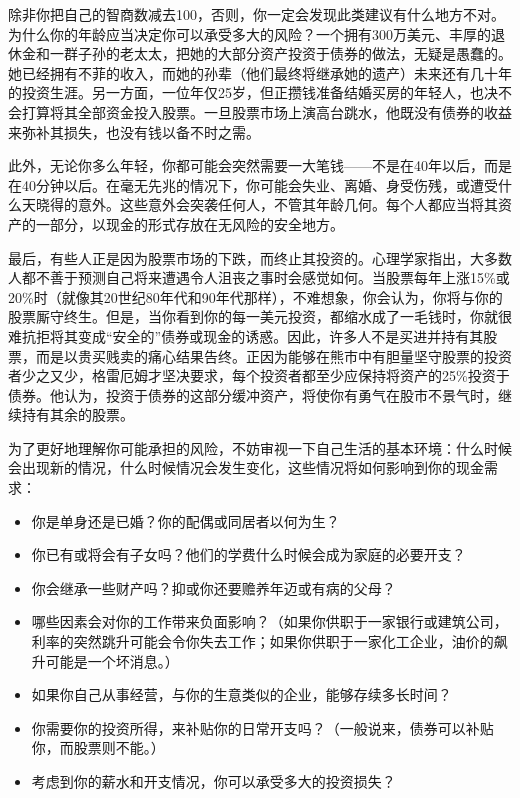 \documentclass[12pt,oneside]{book}
\begin{document}
除非你把自己的智商数减去100，否则，你一定会发现此类建议有什么地方不对。为什么你的年龄应当决定你可以承受多大的风险？一个拥有300万美元、丰厚的退休金和一群子孙的老太太，把她的大部分资产投资于债券的做法，无疑是愚蠢的。她已经拥有不菲的收入，而她的孙辈（他们最终将继承她的遗产）未来还有几十年的投资生涯。另一方面，一位年仅25岁，但正攒钱准备结婚买房的年轻人，也决不会打算将其全部资金投入股票。一旦股票市场上演高台跳水，他既没有债券的收益来弥补其损失，也没有钱以备不时之需。

此外，无论你多么年轻，你都可能会突然需要一大笔钱——不是在40年以后，而是在40分钟以后。在毫无先兆的情况下，你可能会失业、离婚、身受伤残，或遭受什么天晓得的意外。这些意外会突袭任何人，不管其年龄几何。每个人都应当将其资产的一部分，以现金的形式存放在无风险的安全地方。

最后，有些人正是因为股票市场的下跌，而终止其投资的。心理学家指出，大多数人都不善于预测自己将来遭遇令人沮丧之事时会感觉如何。当股票每年上涨15\%或20\%时（就像其20世纪80年代和90年代那样），不难想象，你会认为，你将与你的股票厮守终生。但是，当你看到你的每一美元投资，都缩水成了一毛钱时，你就很难抗拒将其变成“安全的”债券或现金的诱惑。因此，许多人不是买进并持有其股票，而是以贵买贱卖的痛心结果告终。正因为能够在熊市中有胆量坚守股票的投资者少之又少，格雷厄姆才坚决要求，每个投资者都至少应保持将资产的25\%投资于债券。他认为，投资于债券的这部分缓冲资产，将使你有勇气在股市不景气时，继续持有其余的股票。

为了更好地理解你可能承担的风险，不妨审视一下自己生活的基本环境：什么时候会出现新的情况，什么时候情况会发生变化，这些情况将如何影响到你的现金需求：

\begin{itemize}
\item 你是单身还是已婚？你的配偶或同居者以何为生？
\item 你已有或将会有子女吗？他们的学费什么时候会成为家庭的必要开支？
\item 你会继承一些财产吗？抑或你还要赡养年迈或有病的父母？
\item 哪些因素会对你的工作带来负面影响？（如果你供职于一家银行或建筑公司，利率的突然跳升可能会令你失去工作；如果你供职于一家化工企业，油价的飙升可能是一个坏消息。）
\item 如果你自己从事经营，与你的生意类似的企业，能够存续多长时间？
\item 你需要你的投资所得，来补贴你的日常开支吗？（一般说来，债券可以补贴你，而股票则不能。）
\item 考虑到你的薪水和开支情况，你可以承受多大的投资损失？
\end{itemize}
\end{document}
